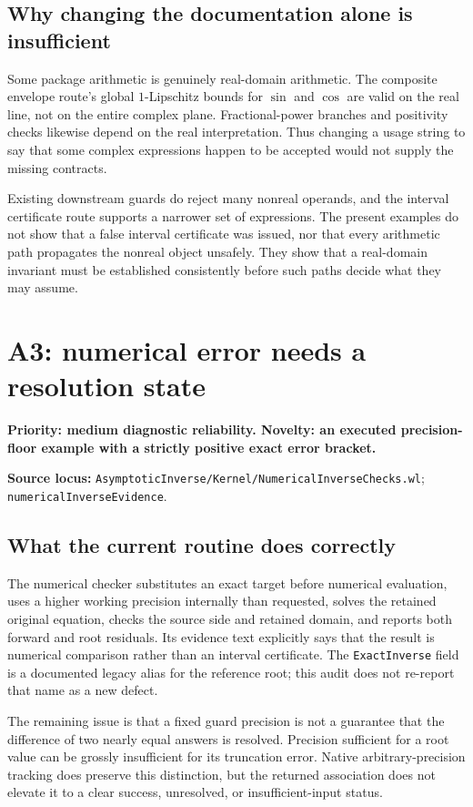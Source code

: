 \documentclass[11pt,letterpaper]{article}
\newcommand{\code}[1]{{\small\nolinkurl{#1}}}
\newcommand{\source}[2]{\textbf{Source locus:} \code{#1}; \code{#2}}
\begin{document}
\subsection{Why changing the documentation alone is insufficient}
Some package arithmetic is genuinely real-domain arithmetic. The composite envelope route's global $1$-Lipschitz bounds for $\sin$ and $\cos$ are valid on the real line, not on the entire complex plane. Fractional-power branches and positivity checks likewise depend on the real interpretation. Thus changing a usage string to say that some complex expressions happen to be accepted would not supply the missing contracts.\cite{envelopes}

Existing downstream guards do reject many nonreal operands, and the interval certificate route supports a narrower set of expressions. The present examples do not show that a false interval certificate was issued, nor that every arithmetic path propagates the nonreal object unsafely. They show that a real-domain invariant must be established consistently before such paths decide what they may assume.

\section{A3: numerical error needs a resolution state}
\label{sec:a3}
\textbf{Priority: medium diagnostic reliability. Novelty: an executed precision-floor example with a strictly positive exact error bracket.}

\source{AsymptoticInverse/Kernel/NumericalInverseChecks.wl}{numericalInverseEvidence}.\cite{numerical}

\subsection{What the current routine does correctly}
The numerical checker substitutes an exact target before numerical evaluation, uses a higher working precision internally than requested, solves the retained original equation, checks the source side and retained domain, and reports both forward and root residuals. Its evidence text explicitly says that the result is numerical comparison rather than an interval certificate. The \code{ExactInverse} field is a documented legacy alias for the reference root; this audit does not re-report that name as a new defect.\cite{numerical}

The remaining issue is that a fixed guard precision is not a guarantee that the difference of two nearly equal answers is resolved. Precision sufficient for a root value can be grossly insufficient for its truncation error. Native arbitrary-precision tracking does preserve this distinction, but the returned association does not elevate it to a clear success, unresolved, or insufficient-input status.\cite{wl-workingprecision,wl-accuracy}
\end{document}
